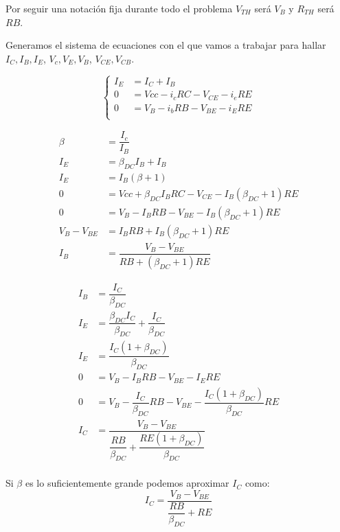 Por seguir una notación fija durante todo el problema $V_{TH}$ será
$V_B$ y $R_{TH}$ será $RB$.

Generamos el sistema de ecuaciones con el que vamos a trabajar para
hallar $I_C,I_B,I_E$, $V_c,V_E,V_B$, $V_{CE},V_{CB}$.

\begin{equation}
  \left \{
    \begin{split}
      I_E & = I_C+I_B\\
      0 & = Vcc - i_cRC-V_{CE}-i_eRE\\
      0 & = V_B-i_bRB-V_{BE}-i_ERE\\
    \end{split}
  \right.
\end{equation}

\begin{equation}
    \begin{split}
      \beta & = \dfrac{I_c}{I_B}\\
      I_E & = \beta_{DC} I_B + I_B\\
      I_E & = I_B(\beta +1)\\
      0 & = Vcc +\beta_{DC} I_BRC-V_{CE}-I_B(\beta_{DC}+1)RE\\
      0 & = V_B-I_BRB-V_{BE}-I_B(\beta_{DC}+1)RE\\
      V_B-V_{BE} & =I_BRB+I_B(\beta_{DC}+1)RE\\
      I_B & = \dfrac{V_B-V_{BE}}{RB+(\beta_{DC}+1)RE}
    \end{split}
  \end{equation}

  \begin{equation}
    \begin{split}
      I_B & = \dfrac{I_C}{\beta_{DC}}\\
      I_E & = \dfrac{\beta_{DC} I_C}{\beta_{DC}} +\dfrac{I_C}{\beta_{DC}}\\
      I_E & = \dfrac{I_C(1+\beta_{DC})}{\beta_{DC}}\\
      0 & = V_B-I_BRB-V_{BE}-I_ERE\\
      0 & = V_B-\dfrac{I_C}{\beta_{DC}}RB-V_{BE}-\dfrac{I_C(1+\beta_{DC})}{\beta_{DC}}RE\\
      I_C & = \dfrac{V_B-V_{BE}}{\dfrac{RB}{\beta_{DC}}+\dfrac{RE(1+\beta_{DC})}{\beta_{DC}}}\\
     \end{split}
   \end{equation}

    Si $\beta$ es lo suficientemente grande podemos aproximar $I_C$ como:
    \[I_C  = \dfrac{V_B-V_{BE}}{\dfrac{RB}{\beta_{DC}}+RE}\]
    
